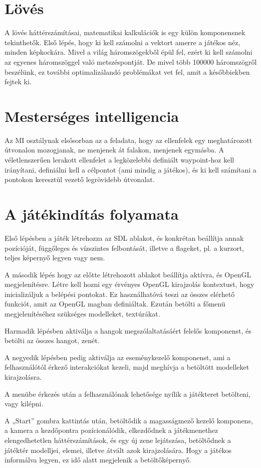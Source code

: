 \section{Lövés}

A lövés háttérszámításai, matematikai kalkulációk is egy külön komponensnek tekinthetők. Első lépés, hogy ki kell számolni a vektort amerre a játékos néz, minden képkockára. Mivel a világ háromszögekből épül fel, ezért ki kell számolni az egyenes háromszöggel való metszéspontját. De mivel több 100000 háromszögről beszélünk, ez további optimalizálandó problémákat vet fel, amit a későbbiekben fejtek ki.

\section{Mesterséges intelligencia}

Az MI osztálynak elsősorban az a feladata, hogy az ellenfelek egy meghatározott útvonalon mozogjanak, ne menjenek át falakon, menjenek egymásba. A véletlenszerűen lerakott ellenfelet a legközelebbi definiált waypoint-hoz kell irányítani, definiálni kell a célpontot (ami mindig a játékos), és ki kell számítani a pontokon keresztül vezető legrövidebb útvonalat.

\section{A játékindítás folyamata}

Első lépésben a játék létrehozza az SDL ablakot, és konkrétan beállítja annak pozícióját, függőleges és vízszintes felbontását, illetve a flageket, pl. a kurzort, teljes képernyő legyen vagy nem.

A második lépés hogy az előtte létrehozott ablakot beállítja aktívra, és OpenGL megjelenítésre. Létre kell hozni egy érvényes OpenGL  kirajzolás kontextust, hogy inicializáljuk a belépési pontokat. Ez használhatóvá teszi az összes elérhető funkciót, amit az OpenGL magban definiáltak. Ezután betölti a főmenü megjelenítéséhez szükséges modelleket, textúrákat.

Harmadik lépésben aktiválja a hangok megszólaltatásáért felelős komponenst, és betölti az összes hangot, zenét.

A negyedik lépésben pedig aktiválja az eseménykezelő komponenst, ami a felhasználótól érkező interakciókat kezeli, majd meghívja a betöltött modelleket kirajzolásra.

A menübe érkezés után a felhasználónak lehetősége nyílik a játékteret betölteni, vagy kilépni. 

A „Start” gombra kattintás után, betöltődik a magasságmező kezelő komponens, a kamera a kezdőpontra pozícionálódik, elkezdődnek a játékmenethez elengedhetetlen háttérszámítások, és egy új zene lejátszása, betöltődnek a játéktér modelljei, elemei, illetve átvált azok kirajzolására. Hogy a játékos informálva legyen, ez idő alatt megjelenik a betöltőképernyő.

